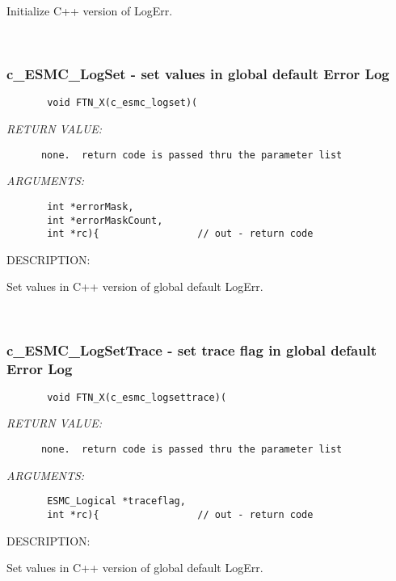        Initialize C++ version of LogErr.
   
 
\mbox{}\hrulefill\ 
 
\subsubsection [c\_ESMC\_LogSet] {c\_ESMC\_LogSet - set values in global default Error Log}


  
\begin{verbatim}       void FTN_X(c_esmc_logset)(\end{verbatim}{\em RETURN VALUE:}
\begin{verbatim}      none.  return code is passed thru the parameter list\end{verbatim}{\em ARGUMENTS:}
\begin{verbatim}       int *errorMask,
       int *errorMaskCount,
       int *rc){                 // out - return code\end{verbatim}
{\sf DESCRIPTION:\\ }


       Set values in C++ version of global default LogErr.
   
 
\mbox{}\hrulefill\ 
 
\subsubsection [c\_ESMC\_LogSetTrace] {c\_ESMC\_LogSetTrace - set trace flag in global default Error Log}


  
\begin{verbatim}       void FTN_X(c_esmc_logsettrace)(\end{verbatim}{\em RETURN VALUE:}
\begin{verbatim}      none.  return code is passed thru the parameter list\end{verbatim}{\em ARGUMENTS:}
\begin{verbatim}       ESMC_Logical *traceflag,
       int *rc){                 // out - return code\end{verbatim}
{\sf DESCRIPTION:\\ }


       Set values in C++ version of global default LogErr.
   
